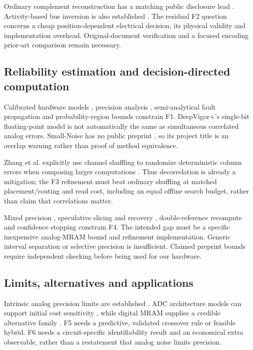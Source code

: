 Ordinary complement reconstruction has a matching public disclosure lead \cite{S20}.
Activity-based bus inversion is also established \cite{S21}. The residual F2 question
concerns a cheap position-dependent electrical decision, its physical validity and
implementation overhead. Original-document verification and a focused encoding prior-art
comparison remain necessary.

\subsection{Reliability estimation and decision-directed computation}

Calibrated hardware models \cite{S08}, precision analysis \cite{S09}, semi-analytical
fault propagation \cite{S10} and probability-region bounds \cite{S11} constrain F1.
DeepVigor+'s single-bit floating-point model is not automatically the same as simultaneous
correlated analog errors. Small-Noise has no public preprint \cite{S22}, so its project
title is an overlap warning rather than proof of method equivalence.

Zhang et al. explicitly use channel shuffling to randomize deterministic column errors
when composing larger computations \cite{S08}. Thus decorrelation is already a mitigation;
the F3 refinement must beat ordinary shuffling at matched placement/routing and read cost,
including an equal offline search budget, rather than claim that correlations matter.

Mixed precision \cite{S12}, speculative slicing and recovery \cite{S13}, double-reference
recompute \cite{S14} and confidence stopping \cite{S30} constrain F4. The intended gap
must be a specific inexpensive analog-MRAM bound and refinement implementation. Generic
interval separation or selective precision is insufficient. Claimed preprint bounds
require independent checking before being used for our hardware.

\subsection{Limits, alternatives and applications}

Intrinsic analog precision limits are established \cite{S15}. ADC architecture models
can support initial cost sensitivity \cite{S16}, while digital MRAM supplies a credible
alternative family \cite{S17}. F5 needs a predictive, validated crossover rule or feasible
hybrid. F6 needs a circuit-specific identifiability result and an economical extra
observable, rather than a restatement that analog noise limits precision.

